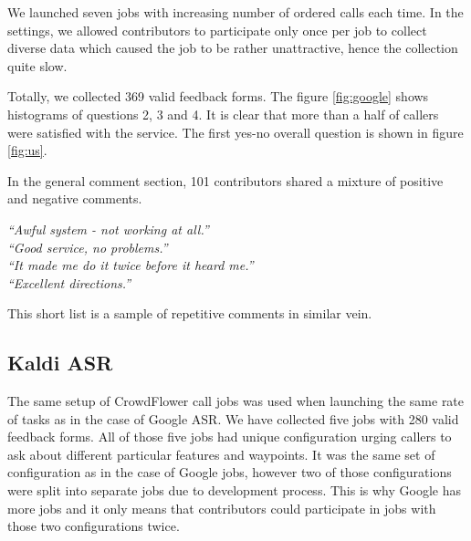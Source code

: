 We launched seven jobs with increasing number of ordered calls each time.
In the settings, we allowed contributors to participate only once per job to collect diverse data which caused the job to be rather unattractive, hence the collection quite slow.

Totally, we collected 369 valid feedback forms.
The figure \ref{fig:google} shows histograms of questions 2, 3 and 4.
It is clear that more than a half of callers were satisfied with the service.
The first yes-no overall question is shown in figure \ref{fig:us}.

In the general comment section, 101 contributors shared a mixture of positive and negative comments.

\begin{flushleft}
\textit{``Awful system - not working at all.''} \\
\textit{``Good service, no problems.''} \\
\textit{``It made me do it twice before it heard me.''} \\
\textit{``Excellent directions.''} \\
\end{flushleft}

\noindent This short list is a sample of repetitive comments in similar vein.

\subsection{Kaldi ASR}

The same setup of CrowdFlower call jobs was used when launching the same rate of tasks as in the case of Google \ac{ASR}.
We have collected five jobs with 280 valid feedback forms.
All of those five jobs had unique configuration urging callers to ask about different particular features and waypoints.
It was the same set of configuration as in the case of Google jobs, however two of those configurations were split into separate jobs due to development process.
This is why Google has more jobs and it only means that contributors could participate in jobs with those two configurations twice.


